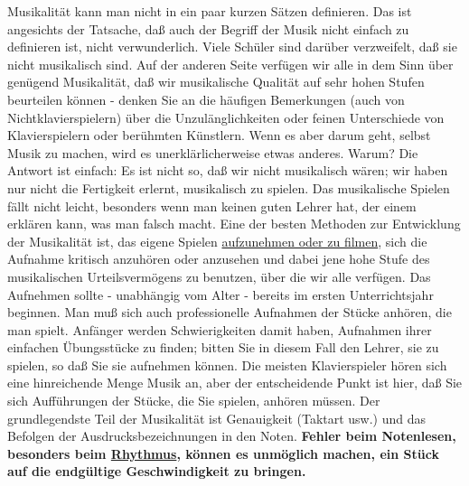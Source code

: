 Musikalität kann man nicht in ein paar kurzen Sätzen definieren.
Das ist angesichts der Tatsache, daß auch der Begriff der Musik nicht einfach zu definieren ist, nicht verwunderlich.
Viele Schüler sind darüber verzweifelt, daß sie nicht musikalisch sind.
Auf der anderen Seite verfügen wir alle in dem Sinn über genügend Musikalität, daß wir musikalische Qualität auf sehr hohen Stufen beurteilen können - denken Sie an die häufigen Bemerkungen (auch von Nichtklavierspielern) über die Unzulänglichkeiten oder feinen Unterschiede von Klavierspielern oder berühmten Künstlern.
Wenn es aber darum geht, selbst Musik zu machen, wird es unerklärlicherweise etwas anderes.
Warum?
Die Antwort ist einfach: Es ist nicht so, daß wir nicht musikalisch wären; wir haben nur nicht die Fertigkeit erlernt, musikalisch zu spielen.
Das musikalische Spielen fällt nicht leicht, besonders wenn man keinen guten Lehrer hat, der einem erklären kann, was man falsch macht.
Eine der besten Methoden zur Entwicklung der Musikalität ist, das eigene Spielen \hyperref[c1iii13]{aufzunehmen oder zu filmen}, sich die Aufnahme kritisch anzuhören oder anzusehen und dabei jene hohe Stufe des musikalischen Urteilsvermögens zu benutzen, über die wir alle verfügen.
Das Aufnehmen sollte - unabhängig vom Alter - bereits im ersten Unterrichtsjahr beginnen.
Man muß sich auch professionelle Aufnahmen der Stücke anhören, die man spielt.
Anfänger werden Schwierigkeiten damit haben, Aufnahmen ihrer einfachen Übungsstücke zu finden; bitten Sie in diesem Fall den Lehrer, sie zu spielen, so daß Sie sie aufnehmen können.
Die meisten Klavierspieler hören sich eine hinreichende Menge Musik an, aber der entscheidende Punkt ist hier, daß Sie sich Aufführungen der Stücke, die Sie spielen, anhören müssen.
Der grundlegendste Teil der Musikalität ist Genauigkeit (Taktart usw.) und das Befolgen der Ausdrucksbezeichnungen in den Noten.
\textbf{Fehler beim Notenlesen, besonders beim \hyperref[c1iii1b]{Rhythmus}, können es unmöglich machen, ein Stück auf die endgültige Geschwindigkeit zu bringen.}

